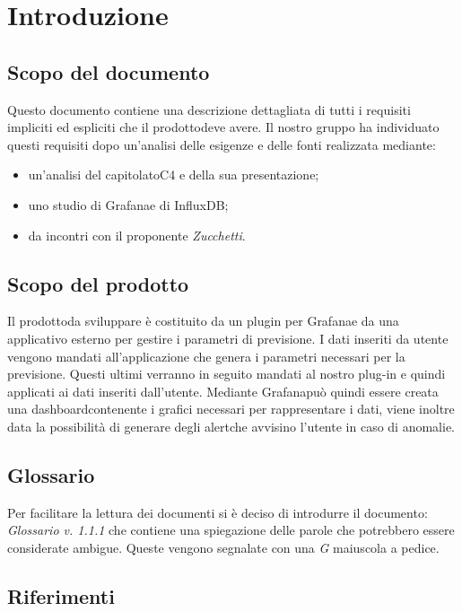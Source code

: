 
\section{Introduzione}
	\subsection{Scopo del documento}
	Questo documento contiene una descrizione dettagliata di tutti i requisiti impliciti ed espliciti che il prodotto\glosp deve avere. Il nostro gruppo ha individuato questi requisiti dopo un'analisi delle esigenze e delle fonti realizzata mediante: 
	\begin{itemize}
		\item un'analisi del capitolato\glosp C4 e della sua presentazione; 
		\item uno studio di Grafana\glosp e di InfluxDB;
		\item da incontri con il proponente \textit{Zucchetti}.
	\end{itemize}
	\subsection{Scopo del prodotto}
	Il prodotto\glosp da sviluppare è costituito da un plugin per Grafana\glosp e da una applicativo esterno per gestire i parametri di previsione. I dati inseriti da utente vengono mandati all'applicazione che genera i parametri necessari per la previsione. Questi ultimi verranno in seguito mandati al nostro plug-in e quindi applicati ai dati inseriti dall'utente. Mediante Grafana\glosp può quindi essere creata una dashboard\glosp contenente i grafici necessari per rappresentare i dati, viene inoltre data la possibilità di generare degli alert\glosp che avvisino l'utente in caso di anomalie.
		
	\subsection{Glossario}
	Per facilitare la lettura dei documenti si è deciso di introdurre il documento: \textit{Glossario v. 1.1.1} che contiene una spiegazione delle parole che potrebbero essere considerate ambigue. Queste vengono segnalate con una \textit{G} maiuscola a pedice.  
	\subsection{Riferimenti}
